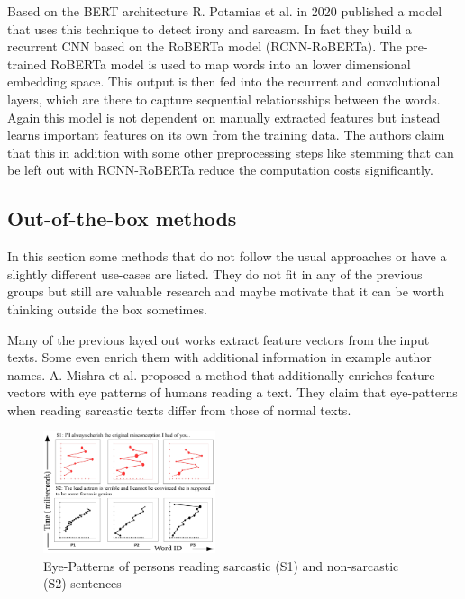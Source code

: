 \documentclass[sigconf,  review=false, nonacm=true]{acmart}
\begin{document}
Based on the BERT architecture R. Potamias et al. in 2020 \cite{A-Transformer-based-approach-to-Irony-and-Sarcasm-detection} published a model that uses this technique to detect irony and sarcasm. In fact they build a recurrent CNN based on the RoBERTa model (RCNN-RoBERTa). The pre-trained RoBERTa model is used to map words into an lower dimensional embedding space. This output is then fed into the recurrent and convolutional layers, which are there to capture sequential relationsships between the words. Again this model is not dependent on manually extracted features but instead learns important features on its own from the training data. The authors claim that this in addition with some other preprocessing steps like stemming that can be left out with RCNN-RoBERTa reduce the computation costs significantly.


\subsection{Out-of-the-box methods}

In this section some methods that do not follow the usual approaches or have a slightly different use-cases are listed. They do not fit in any of the previous groups but still are valuable research and maybe motivate that it can be worth thinking outside the box sometimes.

Many of the previous layed out works extract feature vectors from the input texts. Some even enrich them with additional information in example author names. A. Mishra et al. \cite{eye-patterns} proposed a method that additionally enriches feature vectors with eye patterns of humans reading a text. They claim that eye-patterns when reading sarcastic texts differ from those of normal texts. 

\begin{figure}[H]
    \centering
    \includegraphics[width=0.45\textwidth]{./sources/eye_patterns}
    \caption{Eye-Patterns of persons reading sarcastic (S1) and non-sarcastic (S2) sentences \cite{eye-patterns}}
    \label{fig:eye_patterns}
\end{figure}
\end{document}
